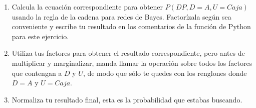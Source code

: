 \begin{enumerate}
 \begin{enumerate}
  \item Calcula la ecuación correspondiente para obtener $P(DP,D=A,U=Caja)$ usando la regla de la cadena para redes de Bayes.  Factorízala según sea conveniente y escribe tu resultado en los comentarios de la función de Python para este ejercicio.
  
  \item Utiliza tus factores para obtener el resultado correspondiente, pero antes de multiplicar y marginalizar, manda llamar la operación  sobre todos los factores que contengan a $D$ y $U$, de modo que sólo te quedes con los renglones donde $D=A$ y $U=Caja$.
  
  \item Normaliza tu resultado final, esta es la probabilidad que estabas buscando.
 \end{enumerate}
\end{enumerate}
